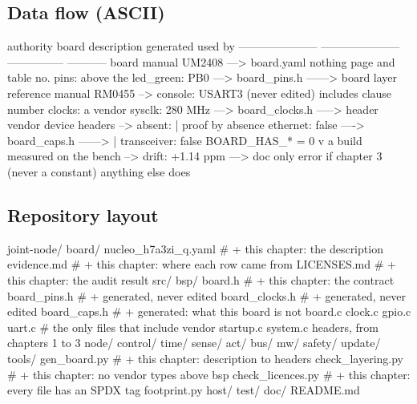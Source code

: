 \subsection*{Data flow (ASCII)}

\begin{asciiart}
  authority                board description         generated            used by
  ---------------------    ---------------------     ---------------      -----------
  board manual UM2408 ---> board.yaml                                      nothing
    page and table no.        pins:                                        above the
                               led_green: PB0   ---> board_pins.h  ------> board layer
  reference manual RM0455 -->  console: USART3       (never edited)        includes
    clause number             clocks:                                      a vendor
                               sysclk: 280 MHz  ---> board_clocks.h -----> header
  vendor device headers  -->  absent:                                      |
    proof by absence           ethernet: false ----> board_caps.h  ------> |
                               transceiver: false     BOARD_HAS_* = 0      v
                                                                        a build
  measured on the bench  -->  drift: +1.14 ppm  ---> doc only            error if
    chapter 3                  (never a constant)                        anything
                                                                        else does
\end{asciiart}

\subsection*{Repository layout}

\begin{plaincode}
joint-node/
  board/
    nucleo_h7a3zi_q.yaml              # + this chapter: the description
    evidence.md                       # + this chapter: where each row came from
    LICENSES.md                       # + this chapter: the audit result
  src/
    bsp/
      board.h                         # + this chapter: the contract
      board_pins.h                    # + generated, never edited
      board_clocks.h                  # + generated, never edited
      board_caps.h                    # + generated: what this board is not
      board.c  clock.c  gpio.c  uart.c   # the only files that include vendor
      startup.c  system.c                 headers, from chapters 1 to 3
    node/  control/  time/
    sense/  act/  bus/  mw/  safety/  update/
  tools/
    gen_board.py                      # + this chapter: description to headers
    check_layering.py                 # + this chapter: no vendor types above bsp
    check_licences.py                 # + this chapter: every file has an SPDX tag
    footprint.py
  host/  test/  doc/
  README.md
\end{plaincode}

